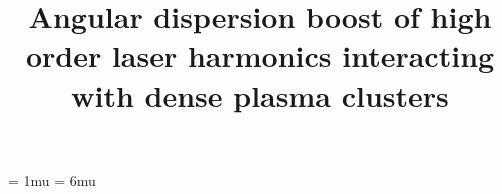 \documentclass[10pt]{article}
\begin{document}



	\pagestyle{fancy}
	\fancyhf{}
	\fancyhead[L]{\textit{\nouppercase{\leftmark}}}
	\fancyfoot[C]{\thepage}

	\thinmuskip = 1mu
	\thickmuskip = 6mu
	\def\stacktype{S}\Sstackgap=-4.3pt
	\captionsetup[subfigure]{margin=0.05\textwidth}


	\newcommand{\subfigureautorefname}{\figureautorefname}


	\title{Angular dispersion boost of high order laser harmonics interacting with dense plasma clusters}
	\author{}
	\maketitle

	
	
	
	


	
	
\end{document}
